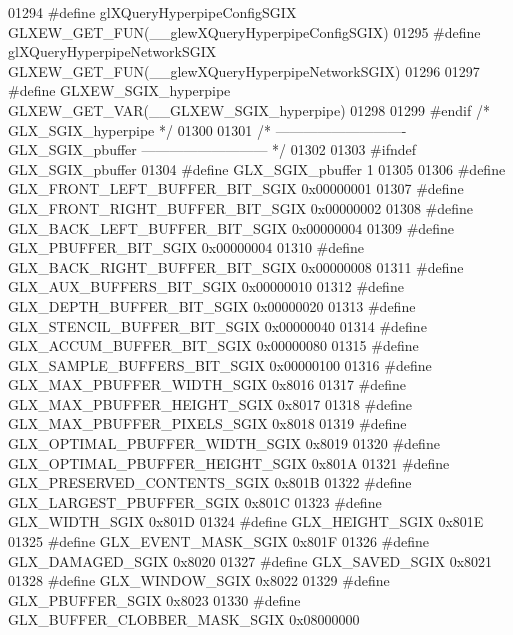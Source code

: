 \begin{DoxyCode}
01294 \textcolor{preprocessor}{#define glXQueryHyperpipeConfigSGIX GLXEW\_GET\_FUN(\_\_glewXQueryHyperpipeConfigSGIX)}
01295 \textcolor{preprocessor}{#define glXQueryHyperpipeNetworkSGIX GLXEW\_GET\_FUN(\_\_glewXQueryHyperpipeNetworkSGIX)}
01296 
01297 \textcolor{preprocessor}{#define GLXEW\_SGIX\_hyperpipe GLXEW\_GET\_VAR(\_\_GLXEW\_SGIX\_hyperpipe)}
01298 
01299 \textcolor{preprocessor}{#endif }\textcolor{comment}{/* GLX\_SGIX\_hyperpipe */}\textcolor{preprocessor}{}
01300 
01301 \textcolor{comment}{/* ---------------------------- GLX\_SGIX\_pbuffer --------------------------- */}
01302 
01303 \textcolor{preprocessor}{#ifndef GLX\_SGIX\_pbuffer}
01304 \textcolor{preprocessor}{#define GLX\_SGIX\_pbuffer 1}
01305 
01306 \textcolor{preprocessor}{#define GLX\_FRONT\_LEFT\_BUFFER\_BIT\_SGIX 0x00000001}
01307 \textcolor{preprocessor}{#define GLX\_FRONT\_RIGHT\_BUFFER\_BIT\_SGIX 0x00000002}
01308 \textcolor{preprocessor}{#define GLX\_BACK\_LEFT\_BUFFER\_BIT\_SGIX 0x00000004}
01309 \textcolor{preprocessor}{#define GLX\_PBUFFER\_BIT\_SGIX 0x00000004}
01310 \textcolor{preprocessor}{#define GLX\_BACK\_RIGHT\_BUFFER\_BIT\_SGIX 0x00000008}
01311 \textcolor{preprocessor}{#define GLX\_AUX\_BUFFERS\_BIT\_SGIX 0x00000010}
01312 \textcolor{preprocessor}{#define GLX\_DEPTH\_BUFFER\_BIT\_SGIX 0x00000020}
01313 \textcolor{preprocessor}{#define GLX\_STENCIL\_BUFFER\_BIT\_SGIX 0x00000040}
01314 \textcolor{preprocessor}{#define GLX\_ACCUM\_BUFFER\_BIT\_SGIX 0x00000080}
01315 \textcolor{preprocessor}{#define GLX\_SAMPLE\_BUFFERS\_BIT\_SGIX 0x00000100}
01316 \textcolor{preprocessor}{#define GLX\_MAX\_PBUFFER\_WIDTH\_SGIX 0x8016}
01317 \textcolor{preprocessor}{#define GLX\_MAX\_PBUFFER\_HEIGHT\_SGIX 0x8017}
01318 \textcolor{preprocessor}{#define GLX\_MAX\_PBUFFER\_PIXELS\_SGIX 0x8018}
01319 \textcolor{preprocessor}{#define GLX\_OPTIMAL\_PBUFFER\_WIDTH\_SGIX 0x8019}
01320 \textcolor{preprocessor}{#define GLX\_OPTIMAL\_PBUFFER\_HEIGHT\_SGIX 0x801A}
01321 \textcolor{preprocessor}{#define GLX\_PRESERVED\_CONTENTS\_SGIX 0x801B}
01322 \textcolor{preprocessor}{#define GLX\_LARGEST\_PBUFFER\_SGIX 0x801C}
01323 \textcolor{preprocessor}{#define GLX\_WIDTH\_SGIX 0x801D}
01324 \textcolor{preprocessor}{#define GLX\_HEIGHT\_SGIX 0x801E}
01325 \textcolor{preprocessor}{#define GLX\_EVENT\_MASK\_SGIX 0x801F}
01326 \textcolor{preprocessor}{#define GLX\_DAMAGED\_SGIX 0x8020}
01327 \textcolor{preprocessor}{#define GLX\_SAVED\_SGIX 0x8021}
01328 \textcolor{preprocessor}{#define GLX\_WINDOW\_SGIX 0x8022}
01329 \textcolor{preprocessor}{#define GLX\_PBUFFER\_SGIX 0x8023}
01330 \textcolor{preprocessor}{#define GLX\_BUFFER\_CLOBBER\_MASK\_SGIX 0x08000000}

\end{DoxyCode}
